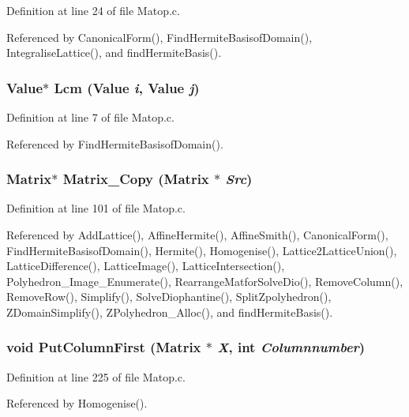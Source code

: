 Definition at line 24 of file Matop.c.

Referenced by Canonical\-Form(), Find\-Hermite\-Basisof\-Domain(), Integralise\-Lattice(), and find\-Hermite\-Basis().

\subsubsection{\setlength{\rightskip}{0pt plus 5cm}Value$\ast$ Lcm (Value {\em i}, Value {\em j})}\label{Matop_8c_a0}




Definition at line 7 of file Matop.c.

Referenced by Find\-Hermite\-Basisof\-Domain().

\subsubsection{\setlength{\rightskip}{0pt plus 5cm}Matrix$\ast$ Matrix\_\-Copy (Matrix $\ast$ {\em Src})}\label{Matop_8c_a5}




Definition at line 101 of file Matop.c.

Referenced by Add\-Lattice(), Affine\-Hermite(), Affine\-Smith(), Canonical\-Form(), Find\-Hermite\-Basisof\-Domain(), Hermite(), Homogenise(), Lattice2Lattice\-Union(), Lattice\-Difference(), Lattice\-Image(), Lattice\-Intersection(), Polyhedron\_\-Image\_\-Enumerate(), Rearrange\-Matfor\-Solve\-Dio(), Remove\-Column(), Remove\-Row(), Simplify(), Solve\-Diophantine(), Split\-Zpolyhedron(), ZDomain\-Simplify(), ZPolyhedron\_\-Alloc(), and find\-Hermite\-Basis().

\subsubsection{\setlength{\rightskip}{0pt plus 5cm}void Put\-Column\-First (Matrix $\ast$ {\em X}, int {\em Columnnumber})}\label{Matop_8c_a10}




Definition at line 225 of file Matop.c.

Referenced by Homogenise().

